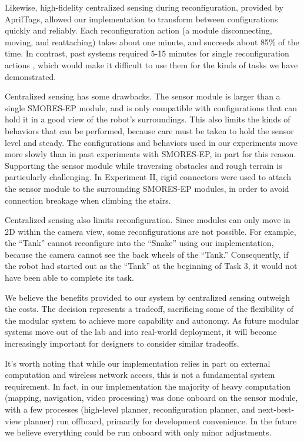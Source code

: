 \documentclass[journal]{IEEEtran}
\begin{document}
Likewise, high-fidelity centralized sensing during reconfiguration, provided by AprilTags, allowed our implementation to transform between configurations quickly and reliably.  Each reconfiguration action (a module disconnecting, moving, and reattaching) takes about one minute, and succeeds about 85\% of the time.  In contrast, past systems required 5-15 minutes for single reconfiguration actions \cite{Yim2007, Rubenstein2004,Murata2006}, which would make it difficult to use them for the kinds of tasks we have demonstrated.

Centralized sensing has some drawbacks.  The sensor module is larger than a single SMORES-EP module, and is only compatible with configurations that can hold it in a good view of the robot's surroundings.  This also limits the kinds of behaviors that can be performed, because care must be taken to hold the sensor level and steady.  The configurations and behaviors used in our experiments move more slowly than in past experiments with SMORES-EP, in part for this reason. Supporting the sensor module while traversing obstacles and rough terrain is particularly challenging.  In Experiment II, rigid connectors were used to attach the sensor module to the surrounding SMORES-EP modules, in order to avoid connection breakage when climbing the stairs.

Centralized sensing also limits reconfiguration. Since modules can only move in 2D within the camera view,  some reconfigurations are not possible.  For example,  the ``Tank'' cannot reconfigure into the ``Snake'' using  our implementation, because the camera cannot see the back wheels of the ``Tank.''  Consequently, if the robot had started out as the ``Tank'' at the beginning of Task 3, it would not have been able to complete its task.

We believe the benefits provided to our system by centralized sensing outweigh the costs.  The decision represents a tradeoff, sacrificing some of the flexibility of the modular system to achieve more capability and autonomy.  As future modular systems move out of the lab and into real-world deployment, it will become increasingly important for designers to consider similar tradeoffs.

It's worth noting that while our implementation relies in part on external computation and wireless network access, this is not a fundamental system requirement.   In fact,  in our implementation the majority of  heavy computation (mapping, navigation, video processing) was done onboard on the sensor module, with a few processes (high-level planner, reconfiguration planner, and next-best-view planner) run offboard, primarily for development convenience. %
In the future we believe everything could be run onboard with only minor adjustments.
%
\end{document}
